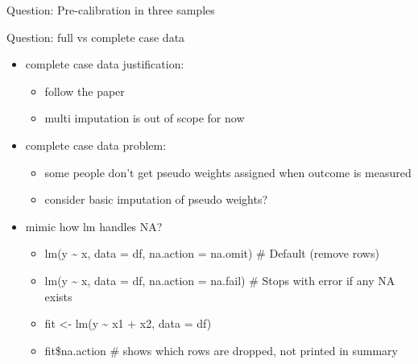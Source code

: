 \documentclass[
  ignorenonframetext,
]{beamer}
\providecommand{\tightlist}{%
  \setlength{\itemsep}{0pt}\setlength{\parskip}{0pt}}
\begin{document}
\begin{frame}{Question: Pre-calibration in three samples}
\label{question-pre-calibration-in-three-samples}
\end{frame}

\begin{frame}{Question: full vs complete case data}
\label{question-full-vs-complete-case-data}
\begin{itemize}
\tightlist
\item
  complete case data justification:

  \begin{itemize}
  \tightlist
  \item
    follow the paper\\
  \item
    multi imputation is out of scope for now
  \end{itemize}
\item
  complete case data problem:

  \begin{itemize}
  \tightlist
  \item
    some people don't get pseudo weights assigned when outcome is
    measured
  \item
    consider basic imputation of pseudo weights?
  \end{itemize}
\item
  mimic how lm handles NA?

  \begin{itemize}
  \tightlist
  \item
    lm(y \textasciitilde{} x, data = df, na.action = na.omit) \# Default
    (remove rows)\\
  \item
    lm(y \textasciitilde{} x, data = df, na.action = na.fail) \# Stops
    with error if any NA exists\\
  \item
    fit \textless- lm(y \textasciitilde{} x1 + x2, data = df)\\
  \item
    fit\$na.action \# shows which rows are dropped, not printed in
    summary
  \end{itemize}
\end{itemize}
\end{frame}
\end{document}
